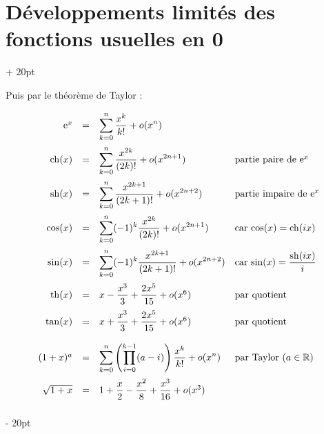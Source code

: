 \documentclass[a4paper, 12pt, twoside]{article}
\newcommand{\R}{\mathbb{R}} %
\newcommand{\lr}[1]{\left( #1 \right)}
\newcommand{\e}{\mathrm{e}}
\newcommand{\ind}[1][20pt]{\advance\leftskip + #1}
\newcommand{\deind}[1][20pt]{\advance\leftskip - #1}
\newenvironment{indt}[2][20pt]{#2 \par \ind[#1]}{\par \deind} %
\begin{document}
\begin{indt}{\section{Développements limités des fonctions usuelles en 0}}
        \vspace{6pt}
        
        Puis par le théorème de Taylor :
        
        \[
            \begin{array}{rcll}
                \e^x &=& \displaystyle \sum_{k = 0}^n \dfrac{x^k}{k!} + o(x^n)
                \vspace{6pt}
                \\
                \mathrm{ch}(x) &=& \displaystyle \sum_{k = 0}^n \dfrac{x^{2k}}{(2k)!} + o(x^{2n + 1})
                & \text{partie paire de $\e^x$}
                \vspace{6pt}
                \\
                \mathrm{sh}(x) &=& \displaystyle \sum_{k = 0}^n \dfrac{x^{2k + 1}}{(2k + 1)!} + o(x^{2n + 2})
                & \text{partie impaire de $\e^x$}
                \vspace{6pt}
                \\
                \cos(x) &=& \displaystyle \sum_{k = 0}^n (-1)^k \dfrac{x^{2k}}{(2k)!} + o(x^{2n + 1})
                & \text{car $\cos(x) = \mathrm{ch}(ix)$}
                \vspace{6pt}
                \\
                \sin(x) &=& \displaystyle \sum_{k = 0}^n (-1)^k \dfrac{x^{2k + 1}}{(2k + 1)!} + o(x^{2n + 2})
                & \text{car $\sin(x) = \dfrac{\mathrm{sh}(ix)}{i}$}
                \vspace{6pt}
                \\
                \mathrm{th}(x) &=& x - \dfrac{x^3}{3} + \dfrac{2x^5}{15} + o(x^6)
                & \text{par quotient}
                \vspace{6pt}
                \\
                \tan(x) &=& x + \dfrac{x^3}{3} + \dfrac{2x^5}{15} + o(x^6)
                & \text{par quotient}
                \vspace{12pt}
                \\
                (1 + x)^a &=& \displaystyle \sum_{k = 0}^n \lr{\prod_{i = 0}^{k - 1} (a - i)} \dfrac{x^k}{k!} + o(x^n)
                & \text{par Taylor ($a \in \R$)}
                \vspace{6pt}
                \\
                \sqrt{1 + x} &=& 1 + \dfrac x 2 - \dfrac{x^2}{8} + \dfrac{x^3}{16} + o(x^3)
                \vspace{6pt}
                \\

\end{array}\]
\end{indt}
\end{document}

